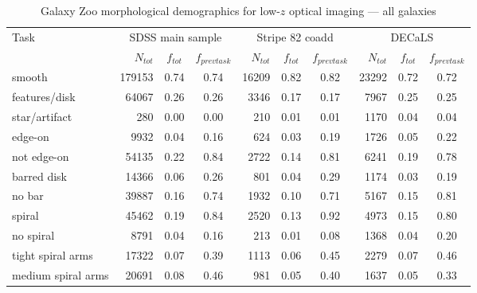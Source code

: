 \documentclass[iop,apj,tighten]{emulateapj}
\begin{document}
\begin{table*}
\centering
\caption{Galaxy Zoo morphological demographics for low-$z$ optical imaging --- all galaxies}\label{tbl:allgals}
\begin{tabular}{l|rcc|rcc|rcc}
\hline\hline
    Task & \multicolumn{3}{c}{SDSS main sample} & \multicolumn{3}{c}{Stripe 82 coadd} & \multicolumn{3}{c}{DECaLS} \\
    
    & $N_{tot}$ & $f_{tot}$ & $f_{prev task}$ & $N_{tot}$ & $f_{tot}$ & $f_{prev task}$ & $N_{tot}$ & $f_{tot}$ & $f_{prev task}$ \\
    \hline
    
    smooth                  & 179153 & 0.74    & 0.74    &  16209 & 0.82    & 0.82    & 23292 & 0.72    & 0.72 \\
    features/disk           &  64067 & 0.26    & 0.26    &   3346 & 0.17    & 0.17    &  7967 & 0.25    & 0.25 \\
    star/artifact           &    280 & 0.00    & 0.00    &    210 & 0.01    & 0.01    &  1170 & 0.04    & 0.04 \\
    \hline                                                                    
    edge-on                 &   9932 & 0.04    & 0.16    &    624 & 0.03    & 0.19    &  1726 & 0.05    & 0.22 \\
    not edge-on             &  54135 & 0.22    & 0.84    &   2722 & 0.14    & 0.81    &  6241 & 0.19    & 0.78 \\
    \hline                                                                              
    barred disk             &  14366 & 0.06    & 0.26    &    801 & 0.04    & 0.29    &  1174 & 0.03    & 0.19 \\
    no bar                  &  39887 & 0.16    & 0.74    &   1932 & 0.10    & 0.71    &  5167 & 0.15    & 0.81 \\
    \hline                                                                              
    spiral                  &  45462 & 0.19    & 0.84    &   2520 & 0.13    & 0.92    &  4973 & 0.15    & 0.80 \\
    no spiral               &   8791 & 0.04    & 0.16    &    213 & 0.01    & 0.08    &  1368 & 0.04    & 0.20 \\
    \hline                                                                            
    tight spiral arms       &  17322 & 0.07    & 0.39    &   1113 & 0.06    & 0.45    &  2279 & 0.07    & 0.46 \\
    medium spiral arms      &  20691 & 0.08    & 0.46    &    981 & 0.05    & 0.40    &  1637 & 0.05    & 0.33 \\

\end{tabular}
\end{table*}
\end{document}
